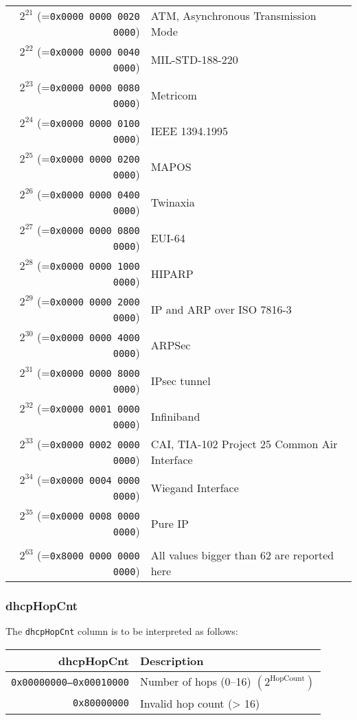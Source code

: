 \documentclass[documentation]{subfiles}
\begin{document}
\begin{longtable}{rl}
    $2^{21}$ (={\tt 0x0000 0000 0020 0000}) & ATM, Asynchronous Transmission Mode \\
    $2^{22}$ (={\tt 0x0000 0000 0040 0000}) & MIL-STD-188-220 \\
    $2^{23}$ (={\tt 0x0000 0000 0080 0000}) & Metricom \\
    $2^{24}$ (={\tt 0x0000 0000 0100 0000}) & IEEE 1394.1995 \\
    $2^{25}$ (={\tt 0x0000 0000 0200 0000}) & MAPOS \\
    $2^{26}$ (={\tt 0x0000 0000 0400 0000}) & Twinaxia \\
    $2^{27}$ (={\tt 0x0000 0000 0800 0000}) & EUI-64 \\
    $2^{28}$ (={\tt 0x0000 0000 1000 0000}) & HIPARP \\
    $2^{29}$ (={\tt 0x0000 0000 2000 0000}) & IP and ARP over ISO 7816-3 \\
    $2^{30}$ (={\tt 0x0000 0000 4000 0000}) & ARPSec \\
    $2^{31}$ (={\tt 0x0000 0000 8000 0000}) & IPsec tunnel \\
    $2^{32}$ (={\tt 0x0000 0001 0000 0000}) & Infiniband \\
    $2^{33}$ (={\tt 0x0000 0002 0000 0000}) & CAI, TIA-102 Project 25 Common Air Interface \\
    $2^{34}$ (={\tt 0x0000 0004 0000 0000}) & Wiegand Interface \\
    $2^{35}$ (={\tt 0x0000 0008 0000 0000}) & Pure IP \\\\
    $2^{63}$ (={\tt 0x8000 0000 0000 0000}) & All values bigger than 62 are reported here\\
    \bottomrule
\end{longtable}

\subsubsection{dhcpHopCnt}\label{dhcpHopCnt}
The {\tt dhcpHopCnt} column is to be interpreted as follows:
\begin{longtable}{rl}
    \toprule
    {\bf dhcpHopCnt} & {\bf Description}\\
    \midrule\endhead%
    {\tt 0x00000000--0x00010000} & Number of hops (0--16) $\left(2^\text{HopCount}\right)$ \\
    {\tt 0x80000000} & Invalid hop count (> 16)\\
    \bottomrule
\end{longtable}
\end{document}
